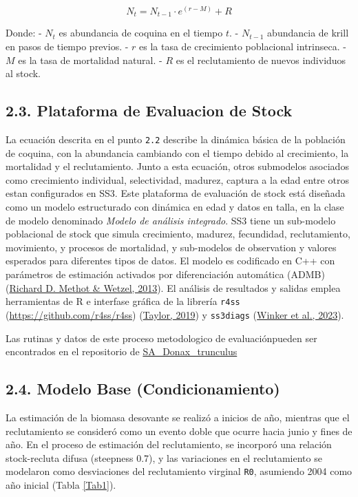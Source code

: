 \documentclass[
]{article}
\begin{document}
\[
N_t = N_{t-1} \cdot e^{(r - M)} + R
\]

Donde:
- \(N_t\) es abundancia de coquina en el tiempo \(t\).
- \(N_{t-1}\) abundancia de krill en pasos de tiempo previos.
- \(r\) es la tasa de crecimiento poblacional intrinseca.
- \(M\) es la tasa de mortalidad natural.
- \(R\) es el reclutamiento de nuevos individuos al stock.

\hypertarget{plataforma-de-evaluacion-de-stock}{%
\subsection{2.3. Plataforma de Evaluacion de Stock}\label{plataforma-de-evaluacion-de-stock}}

La ecuación descrita en el punto \texttt{2.2} describe la dinámica básica de la población de coquina, con la abundancia cambiando con el tiempo debido al crecimiento, la mortalidad y el reclutamiento. Junto a esta ecuación, otros submodelos asociados como crecimiento individual, selectividad, madurez, captura a la edad entre otros estan configurados en SS3. Este plataforma de evaluación de stock está diseñada como un modelo estructurado con dinámica en edad y datos en talla, en la clase de modelo denominado \emph{Modelo de análisis integrado}. SS3 tiene un sub-modelo poblacional de stock que simula crecimiento, madurez, fecundidad, reclutamiento, movimiento, y procesos de mortalidad, y sub-modelos de observation y valores esperados para diferentes tipos de datos. El modelo es codificado en C++ con parámetros de estimación activados por diferenciación automática (ADMB) (\protect\hyperlink{ref-Methot2013}{Richard D. Methot \& Wetzel, 2013}). El análisis de resultados y salidas emplea herramientas de R e interfase gráfica de la librería \texttt{r4ss} (\url{https://github.com/r4ss/r4ss}) (\protect\hyperlink{ref-Taylor2019}{Taylor, 2019}) y \texttt{ss3diags} (\protect\hyperlink{ref-Henning2023}{Winker et al., 2023}).

Las rutinas y datos de este proceso metodologico de evaluaciónpueden ser encontrados en el repositorio de \href{https://github.com/MauroMardones/SA_Donax_trunculus}{SA\_Donax\_trunculus}

\hypertarget{modelo-base-condicionamiento}{%
\subsection{2.4. Modelo Base (Condicionamiento)}\label{modelo-base-condicionamiento}}

La estimación de la biomasa desovante se realizó a inicios de año, mientras que el reclutamiento se consideró como un evento doble que ocurre hacia junio y fines de año. En el proceso de estimación del reclutamiento, se incorporó una relación stock-recluta difusa (steepness 0.7), y las variaciones en el reclutamiento se modelaron como desviaciones del reclutamiento virginal \texttt{R0}, asumiendo 2004 como año inicial (Tabla \ref{Tab1}).
\end{document}
